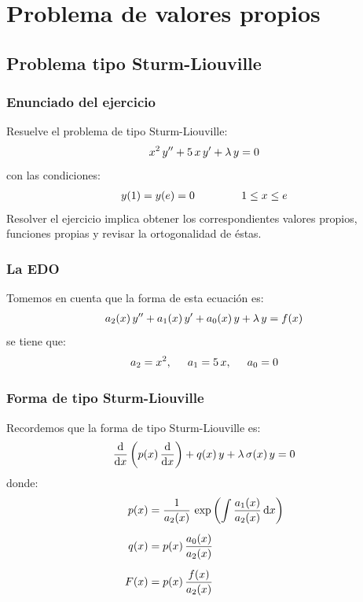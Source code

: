 \documentclass[12pt]{beamer}
\begin{document}
\section{Problema de valores propios}
\subsection{Problema tipo Sturm-Liouville}

\begin{frame}
\frametitle{Enunciado del ejercicio}
Resuelve el problema de tipo Sturm-Liouville:
\pause
\begin{align*}
x^{2} \, {y}^{\prime \prime} + 5 \, x \, {y}^{\prime} + \lambda \, y = 0
\end{align*}
con las condiciones:
\begin{align*}
y(1) = y(e) = 0 \hspace{1.5cm} 1 \leq x \leq e
\end{align*}
\pause
Resolver el ejercicio implica obtener los correspondientes valores propios, funciones propias y revisar la ortogonalidad de éstas.
\end{frame}
\begin{frame}
\frametitle{La EDO}
Tomemos en cuenta que la forma de esta ecuación es:
\pause
\begin{align*}
a_{2} (x) \, {y}^{\prime \prime} + a_{1} (x) \, {y}^{\prime} + a_{0}(x) \, y + \lambda \, y = f(x)
\end{align*}
\pause
se tiene que:
\begin{align*}
a_{2} = x^{2}, \hspace{0.5cm} a_{1} = 5\, x, \hspace{0.5cm} a_{0} = 0
\end{align*}
\end{frame}
\begin{frame}
\frametitle{Forma de tipo Sturm-Liouville}
Recordemos que la forma de tipo Sturm-Liouville es:
\pause
\begin{align*}
\dv{x} \left( p(x) \, \dv{x} \right) + q(x) \, y + \lambda \, \sigma (x) \, y = 0
\end{align*}
donde:
\begin{align*}
p(x) &= \dfrac{1}{a_{2}(x)} \, \exp \left( \scaleint{5ex} \, \dfrac{a_{1}(x)}{a_{2}(x)} \dd{x} \right) \\[0.5em]
q(x) &= p(x) \, \dfrac{a_{0}(x)}{a_{2}(x)} \\[0.5em]
F(x) &= p(x) \, \dfrac{f(x)}{a_{2}(x)}
\end{align*}
\end{frame}
\end{document}

